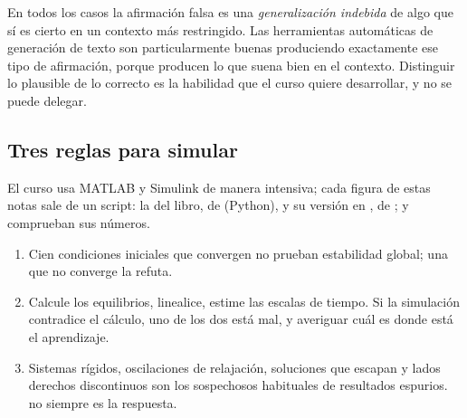 \begin{ideaclave}
En todos los casos la afirmación falsa es una \emph{generalización indebida} de algo que sí es cierto en un contexto más restringido. Las herramientas automáticas de generación de texto son particularmente buenas produciendo exactamente ese tipo de afirmación, porque producen lo que suena bien en el contexto. Distinguir lo plausible de lo correcto es la habilidad que el curso quiere desarrollar, y no se puede delegar.
\end{ideaclave}

\subsection{Tres reglas para simular}

El curso usa MATLAB y Simulink de manera intensiva; cada figura de estas notas sale de un script: la del libro, de  (Python), y su versión en \matlab, de ;  y  comprueban sus números.
\begin{enumerate}
  \item {} Cien condiciones iniciales que convergen no prueban estabilidad global; una que no converge la refuta.
  \item {} Calcule los equilibrios, linealice, estime las escalas de tiempo. Si la simulación contradice el cálculo, uno de los dos está mal, y averiguar cuál es donde está el aprendizaje.
  \item {} Sistemas rígidos, oscilaciones de relajación, soluciones que escapan y lados derechos discontinuos son los sospechosos habituales de resultados espurios.  no siempre es la respuesta.
\end{enumerate}
